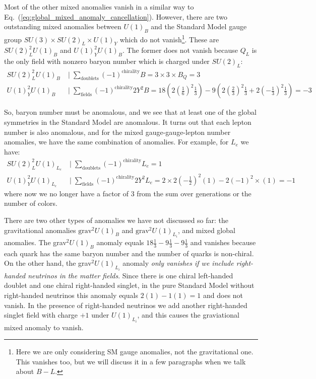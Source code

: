 \documentclass[11pt, oneside]{article}   	%
\theoremstyle{definition}
\numberwithin{equation}{subsection}		%
\begin{document}
Most of the other mixed anomalies vanish in a similar way to Eq.~(\ref{eq:global_mixed_anomaly_cancellation}). However, there are two outstanding mixed 
anomalies between $U(1)_B$ and the Standard Model gauge group $SU(3)\times SU(2)_L\times U(1)_Y$ which do not vanish\footnote{Here we are only considering  
SM gauge anomalies, not the gravitational one. This vanishes too, but we will discuss it in a few paragraphs when we talk about $B - L$.}. 
These are $SU(2)_L^2 U(1)_B$ and $U(1)_Y^2 U(1)_B$. The former does not vanish because $Q_L$ is the only field with 
nonzero baryon number which is charged under $SU(2)_L$:
\begin{align}
	SU(2)_L^2 U(1)_B \;&\bigg| \;\sum_\mathrm{doublets} (-1)^\mathrm{chirality} B = 3\times 3\times B_Q = 3 \\
	U(1)_Y^2 U(1)_B \;&\bigg| \;\sum_\mathrm{fields} (-1)^\mathrm{chirality} 2 Y^2 B = 18 \left(2\left(\frac{1}{6}\right)^2 \frac{1}{3}\right) - 9\left(2\left(\frac{2}{3}\right)^2\frac{1}{3} + 2\left(-\frac{1}{3}\right)^2\frac{1}{3}\right) = -3 \nonumber
\end{align}

So, baryon number must be anomalous, and we see that at least one of the global symmetries in the Standard Model are anomalous. It turns out that each lepton number 
is also anomalous, and for the mixed gauge-gauge-lepton number anomalies, we have the same combination of anomalies. For example, for $L_e$ we have:
\begin{align}
	SU(2)_L^2 U(1)_{L_e} \;&\bigg| \;\sum_\mathrm{doublets} (-1)^\mathrm{chirality} L_e = 1 \\
	U(1)_Y^2 U(1)_{L_e} \;&\bigg| \;\sum_\mathrm{fields} (-1)^\mathrm{chirality} 2 Y^2 L_e = 2\times 2\left(-\frac{1}{2}\right)^2 (1) - 2 (-1)^2\times (1) = -1 \nonumber
\end{align}
where now we no longer have a factor of 3 from the sum over generations or the number of colors. 

There are two other types of anomalies we have not discussed so far: the gravitational anomalies $\mathrm{grav}^2 U(1)_B$ and $\mathrm{grav}^2 U(1)_{L_i}$, and 
mixed global anomalies. The grav$^2 U(1)_B$ anomaly equals $18\frac{1}{3} - 9\frac{1}{3} - 9\frac{1}{3}$ and vanishes because each quark has the same 
baryon number and the number of quarks is non-chiral. On the other hand, the grav$^2 U(1)_{L_i}$ anomaly \textit{only vanishes if we include right-handed 
neutrinos in the matter fields}. Since there is one chiral left-handed doublet and one chiral right-handed singlet, in the pure Standard Model 
without right-handed neutrinos this anomaly equals $2 (1) - 1(1) = 1$ and does not vanish. In the presence of right-handed neutrinos we 
add another right-handed singlet field with charge $+1$ under $U(1)_{L_i}$, and this causes the graviational mixed anomaly to vanish. 
\end{document}

